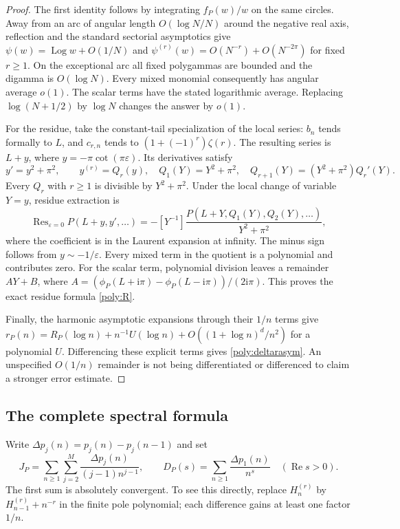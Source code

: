 \documentclass[11pt,a4paper]{article}
\numberwithin{equation}{section}
\theoremstyle{definition}
\theoremstyle{remark}
\DeclareMathOperator*{\Res}{Res}
\DeclareMathOperator{\Log}{Log}
\DeclareMathOperator{\re}{Re}
\newcommand{\ii}{\mathrm i}
\begin{document}
\begin{proof}
The first identity follows by integrating $f_P(w)/w$ on the same
circles. Away from an arc of angular length $O(\log N/N)$ around the
negative real axis, reflection and the standard sectorial asymptotics
give $\psi(w)=\Log w+O(1/N)$ and
$\psi^{(r)}(w)=O(N^{-r})+O(N^{-2\pi})$ for fixed $r\ge1$.
On the exceptional arc all fixed polygammas are bounded and the digamma
is $O(\log N)$. Every mixed monomial consequently has angular average
$o(1)$. The scalar terms have the stated logarithmic average. Replacing
$\log(N+1/2)$ by $\log N$ changes the answer by $o(1)$.

For the residue, take the constant-tail specialization of the local
series: $b_n$ tends formally to $L$, and
$c_{r,n}$ tends to $(1+(-1)^r)\zeta(r)$. The resulting series is
$L+y$, where $y=-\pi\cot(\pi\varepsilon)$. Its derivatives satisfy
\[
 y'=y^2+\pi^2,
 \qquad y^{(r)}=Q_r(y),\quad
 Q_1(Y)=Y^2+\pi^2,\quad
 Q_{r+1}(Y)=(Y^2+\pi^2)Q_r'(Y).
\]
Every $Q_r$ with $r\ge1$ is divisible by $Y^2+\pi^2$.
Under the local change of variable $Y=y$, residue extraction is
\begin{equation}\label{poly:reschange}
 \Res_{\varepsilon=0}P(L+y,y',\ldots)
 =-[Y^{-1}]
 \frac{P(L+Y,Q_1(Y),Q_2(Y),\ldots)}{Y^2+\pi^2},
\end{equation}
where the coefficient is in the Laurent expansion at infinity.
The minus sign follows from $y\sim-1/\varepsilon$.
Every mixed term in the quotient is a polynomial and contributes zero.
For the scalar term, polynomial division leaves a remainder $AY+B$,
where
$A=(\phi_P(L+\ii\pi)-\phi_P(L-\ii\pi))/(2\ii\pi)$.
This proves the exact residue formula \eqref{poly:R}.

Finally, the harmonic asymptotic expansions through their $1/n$ terms
give $r_P(n)=R_P(\log n)+n^{-1}U(\log n)
+O((1+\log n)^d/n^2)$ for a polynomial $U$.
Differencing these explicit terms gives \eqref{poly:deltarasym}.
An unspecified $O(1/n)$ remainder is not being differentiated or
differenced to claim a stronger error estimate.
\end{proof}

\subsection{The complete spectral formula}

Write $\Delta p_j(n)=p_j(n)-p_j(n-1)$ and set
\begin{equation}\label{poly:JD}
 J_P=\sum_{n\ge1}\sum_{j=2}^M
          \frac{\Delta p_j(n)}{(j-1)n^{j-1}},\qquad
 D_P(s)=\sum_{n\ge1}\frac{\Delta p_1(n)}{n^s}\quad(\re s>0).
\end{equation}
The first sum is absolutely convergent. To see this directly, replace
$H_n^{(r)}$ by $H_{n-1}^{(r)}+n^{-r}$ in the finite pole polynomial;
each difference gains at least one factor $1/n$.
\end{document}
